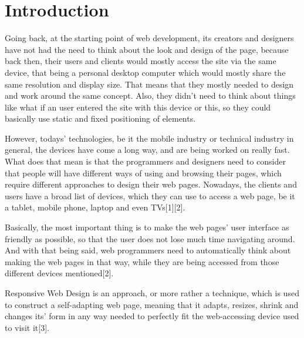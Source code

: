 %
%
% 
% 
% 


\chapter{Introduction}

\label{chap:Intro}

Going back, at the starting point of web development, its creators
and designers have not had the need to think about the look and design
of the page, because back then, their users and clients would mostly access
the site via the same device, that being a personal desktop computer which would
mostly share the same resolution and display size. That means that they mostly
needed to design and work around the same concept. Also, they didn’t need to think
about things like what if an user entered the site with this device or this, so
they could basically use static and fixed positioning of elements.

However, todays' technologies, be it the mobile industry or technical industry
in general, the devices have come a long way, and are being worked on really
fast. What does that mean is that the programmers and designers need 
to consider that people will have different ways of using and browsing their 
pages, which require different approaches to design their web pages.
Nowadays, the clients and users have a broad list of devices, which they can use
to access a web page, be it a tablet, mobile phone, laptop and even TVs[1][2].    

Basically, the most important thing is to make the web pages' user interface 
as friendly as possible, so that the user does not lose much time navigating around.
And with that being said, web programmers need to automatically think about
making the web pages in that way, while they are being accessed from those different
devices mentioned[2].

Responsive Web Design is an approach, or more rather a technique, which is used
to construct a self-adapting web page, meaning that it adapts, resizes, shrink
and changes its' form in any way needed to perfectly fit the web-accessing device
used to visit it[3].   





